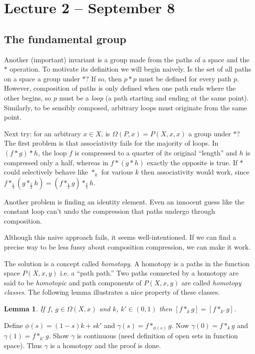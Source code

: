 \documentclass[letterpaper]{article}
\newtheorem{lemma}[theorem]{Lemma}
\newenvironment{proof}[1][Proof]{\begin{trivlist}
\item[\hskip \labelsep {\bfseries #1}]}{\end{trivlist}}
\begin{document}
\section{Lecture 2 -- September 8}

\subsection{The fundamental group}

Another (important) invariant is a group made from the paths of a space and the $\ast$ operation. To motivate its definition we will begin naively. Is the set of all paths on a space a group under $\ast$? If so, then $p \ast p$ must be defined for every path $p$. However, composition of paths is only defined when one path ends where the other begins, so $p$ must be a \emph{loop} (a path starting and ending at the same point). Similarly, to be sensibly composed, arbitrary loops must originate from the same point.

Next try: for an arbitrary $x \in X$, is $\Omega(P, x) = P(X, x, x)$ a group under $\ast$? The first problem is that associativity fails for the majority of loops. In $(f \ast g) \ast h$, the loop $f$ is compressed to a quarter of its original ``length'' and $h$ is compressed only a half, whereas in $f \ast (g \ast h)$ exactly the opposite is true. If $\ast$ could selectively behave like $\ast_k$ for various $k$ then associativity would work, since $f \ast_\frac{1}{3} (g \ast_\frac{1}{2} h) = (f \ast_\frac{1}{2} g) \ast_\frac{2}{3} h$.

Another problem is finding an identity element. Even an innocent guess like the constant loop can't undo the compression that paths undergo through composition.

Although this naive approach fails, it seems well-intentioned. If we can find a precise way to be less fussy about composition compression, we can make it work.

The solution is a concept called \emph{homotopy}. A homotopy is a paths in the function space $P(X, x, y)$ i.e. a ``path path.'' Two paths connected by a homotopy are said to be \emph{homotopic} and path components of $P(X, x, y)$ are called \emph{homotopy classes}. The following lemma illustrates a nice property of these classes.

\begin{lemma}
If $f$, $g \in \Omega(X, x)$ and $k$, $k' \in (0, 1)$ then $[f \ast_k g] = [f \ast_{k'} g]$.
\end{lemma}
\begin{proof}
Define $\phi(s) = (1 - s)k + sk'$ and $\gamma(s) = f \ast_{\phi(s)} g$. Now $\gamma(0) = f \ast_k g$ and $\gamma(1) = f \ast_{k'} g$. Show $\gamma$ is continuous (need definition of open sets in function space). Thus $\gamma$ is a homotopy and the proof is done.
\end{proof}
\end{document}

